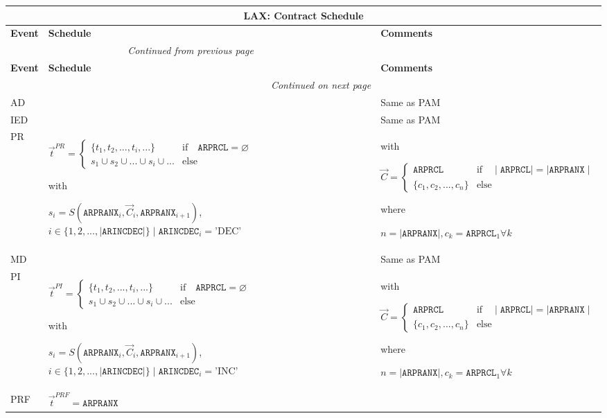 \documentclass[9pt,oneside]{amsart}
\newenvironment{schedule}[1]{
	\hfill %
	\begin{longtable}{| p{0.05\textwidth} | p{0.5\textwidth} |  p{0.4\textwidth} |}
	\multicolumn{3}{c}{\textbf{#1: Contract Schedule}}\\
	\hline
	\textbf{Event} & \textbf{Schedule} & \textbf{Comments} \\
	\hline
	\endfirsthead
	\multicolumn{2}{c}{\textit{Continued from previous page}} \\
	\hline
	\textbf{Event} & \textbf{Schedule} & \textbf{Comments} \\
	\hline
	\endhead
	\hline \multicolumn{2}{r}{\textit{Continued on next page}} \\
	\endfoot
	\endlastfoot
}{%
	\hline
	\end{longtable}
}
\newcommand{\attr}[1]{\texttt{#1}}
\newcommand{\sdl}[3]{S(#1,#2,#3)}
\newcommand{\undef}{\varnothing}
\begin{document}
\begin{schedule}{LAX}
	AD & & Same as PAM \\
	\hline
	IED & & Same as PAM \\
	\hline
	PR & $\vec{t}^{PR} = \begin{cases} \{ t_1, t_2, ..., t_i, ... \} & \text{if}\quad \attr{ARPRCL}=\undef \\
					s_1 \cup s_2 \cup ... \cup s_i \cup ... & \text{else} \end{cases}$ \par
		with\par
		$s_i=\sdl{\attr{ARPRANX}_i}{\vec{C}_i}{\attr{ARPRANX}_{i+1}}$, $i\in\{1,2,...,\mid\attr{ARINCDEC}\mid\} \mid \attr{ARINCDEC}_i = \text{'DEC'}$
		& with\par $\vec{C} = \begin{cases} \attr{ARPRCL} & \text{if} \quad \mid\attr{ARPRCL}\mid = \mid \attr{ARPRANX}\mid \\
				   \{ c_1, c_2, ..., c_n \}  & \text{else} \end{cases}$ \par
			where\par
			$n=\mid\attr{ARPRANX}\mid, c_k=\attr{ARPRCL}_1\forall k$ \\
	\hline
	MD & & Same as PAM \\
	\hline
	PI & $\vec{t}^{PI} = \begin{cases} \{ t_1, t_2, ..., t_i, ... \} & \text{if}\quad \attr{ARPRCL}=\undef \\
					s_1 \cup s_2 \cup ... \cup s_i \cup ... & \text{else} \end{cases}$ \par
		with\par
		$s_i=\sdl{\attr{ARPRANX}_i}{\vec{C}_i}{\attr{ARPRANX}_{i+1}}$, $i\in\{1,2,...,\mid\attr{ARINCDEC}\mid\} \mid \attr{ARINCDEC}_i = \text{'INC'}$
		& with\par $\vec{C} = \begin{cases} \attr{ARPRCL} & \text{if} \quad \mid\attr{ARPRCL}\mid = \mid \attr{ARPRANX}\mid \\
				   \{ c_1, c_2, ..., c_n \}  & \text{else} \end{cases}$ \par
			where\par
			$n=\mid\attr{ARPRANX}\mid, c_k=\attr{ARPRCL}_1\forall k$ \\
	\hline
	PRF & $\vec{t}^{PRF} = \attr{ARPRANX}$ & \\

\end{schedule}
\end{document}
